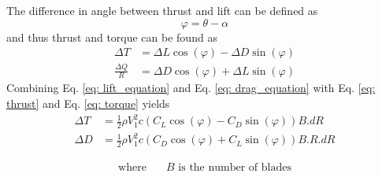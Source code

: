 The difference in angle between thrust and lift can be defined as \[\varphi = \theta - \alpha\] and thus thrust and torque can be found as 
\begin{align}
    \Delta T &= \Delta L\cos(\varphi) - \Delta D\sin(\varphi)  \label{eq: thrust}\\
    \frac{\Delta Q}{R} &= \Delta D\cos(\varphi) + \Delta L\sin(\varphi)  \label{eq: torque}
\end{align}
Combining Eq. \ref{eq: lift_equation} and Eq. \ref{eq: drag_equation} with Eq. \ref{eq: thrust} and Eq. \ref{eq: torque} yields
\begin{align}
    \Delta T &=  \frac{1}{2} \rho V_1^2 c (C_L\cos(\varphi) - C_D\sin(\varphi)) B. dR\\
    \Delta D &=  \frac{1}{2} \rho V_1^2 c (C_D\cos(\varphi) + C_L\sin(\varphi) )B.R.dR
\end{align}
\begin{minipage}{0.45\textwidth}
    \vspace*{-8mm}
    \begin{align*}
        \text{where} \quad
        &B  \text{ is the number of blades} 
    \end{align*}
    \end{minipage}

